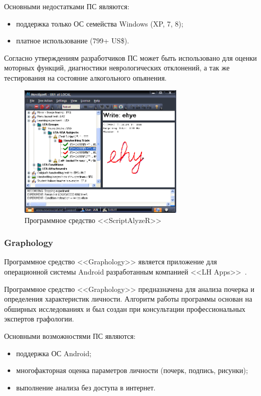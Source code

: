 Основными недостатками ПС являются:
\begin{itemize}
  \item поддержка только ОС семейства Windows (XP, 7, 8);
  \item платное использование (799+ US\$).
\end{itemize}

Согласно утверждениям разработчиков ПС может быть использовано для оценки моторных функций, диагностики неврологических отклонений, а так же тестирования на состояние алкогольного опьянения.

\begin{figure}[ht]
    \centering
    \label{fig:domain:analogs:neuro_script}
    \includegraphics[width=0.7\textwidth]{figures/neuroscript.png}
    \caption{Программное средство <<ScriptAlyzeR>>}
\end{figure}

\subsubsection{Graphology}
\label{sub:domain:analogs:graphology} 

Программное средство <<Graphology>> является приложение для операционной системы Android разработанным компанией <<LH Apps>>~\cite{analogs_graphology}.

Программное средство <<Graphology>> предназначена для анализа почерка и определения характеристик личности. Алгоритм работы программы основан на обширных исследованиях и был создан при консультации профессиональных экспертов графологии.

Основными возможностями ПС являются:
\begin{itemize}
  \item поддержка ОС Android;
  \item многофакторная оценка параметров личности (почерк, подпись, рисунки);
  \item выполнение анализа без доступа в интернет.
\end{itemize}

